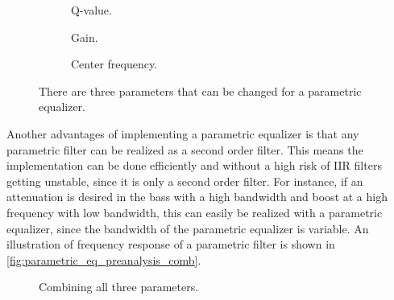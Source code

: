 \begin{figure}[H]
\centering
\hspace*{-1cm}
\begin{subfigure}[t]{0.3\textwidth}
	
	\caption{Q-value.}
	\label{fig:parametric_q}
\end{subfigure}
\hspace{2mm} 
\begin{subfigure}[t]{0.3\textwidth}
	
	\caption{Gain.}
	\label{fig:parametric_db}
\end{subfigure}
\hspace{2mm}
\begin{subfigure}[t]{0.3\textwidth}
	
	\caption{Center frequency.}
	\label{fig:parametric_fc}
\end{subfigure}
\caption{There are three parameters that can be changed for a parametric equalizer.}
\label{fig:parametric_equalizer}
\end{figure}

Another advantages of implementing a parametric equalizer is that any parametric filter can be realized as a second order filter. This means the implementation can be done efficiently and without a high risk of IIR filters getting unstable, since it is only a second order filter. For instance, if an attenuation is desired in the bass with a high bandwidth and boost at a high frequency with low bandwidth, this can easily be realized with a parametric equalizer, since the bandwidth of the parametric equalizer is variable. An illustration of frequency response of a parametric filter is shown in \autoref{fig:parametric_eq_preanalysis_comb}.

\begin{figure}[H]
\centering
{}

\caption{Combining all three parameters.}
\label{fig:parametric_eq_preanalysis_comb}
\end{figure}


